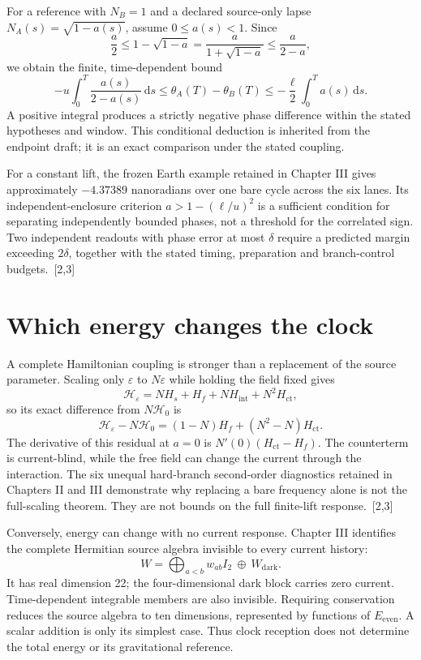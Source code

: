 \documentclass[10pt,twocolumn,letterpaper]{article}
\newcommand{\dd}{\mathrm{d}}
\begin{document}
For a reference with $N_B=1$ and a declared source-only lapse $N_A(s)=\sqrt{1-a(s)}$, assume $0\le a(s)<1$. Since
\[
 \frac a 2\le 1-\sqrt{1-a}=\frac{a}{1+\sqrt{1-a}}
 \le\frac{a}{2-a},
\]
we obtain the finite, time-dependent bound
\[
 -u\int_0^T\frac{a(s)}{2-a(s)}\,\dd s
 \le\theta_A(T)-\theta_B(T)
 \le-\frac\ell 2\int_0^Ta(s)\,\dd s.
\]
A positive integral produces a strictly negative phase difference within the stated hypotheses and window. This conditional deduction is inherited from the endpoint draft; it is an exact comparison under the stated coupling.

For a constant lift, the frozen Earth example retained in Chapter III gives approximately $-4.37389$ nanoradians over one bare cycle across the six lanes. Its independent-enclosure criterion $a>1-(\ell/u)^2$ is a sufficient condition for separating independently bounded phases, not a threshold for the correlated sign. Two independent readouts with phase error at most $\delta$ require a predicted margin exceeding $2\delta$, together with the stated timing, preparation and branch-control budgets.~[2,3]


\section{Which energy changes the clock}
A complete Hamiltonian coupling is stronger than a replacement of the source parameter. Scaling only $\varepsilon$ to $N\varepsilon$ while holding the field fixed gives
\[
 \mathcal H_\varepsilon=NH_s+H_f+NH_{\mathrm{int}}+N^2H_{\mathrm{ct}},
\]
so its exact difference from $N\mathcal H_0$ is
\[
 \mathcal H_\varepsilon-N\mathcal H_0
 =(1-N)H_f+(N^2-N)H_{\mathrm{ct}}.
\]
The derivative of this residual at $a=0$ is $N'(0)(H_{\mathrm{ct}}-H_f)$. The counterterm is current-blind, while the free field can change the current through the interaction. The six unequal hard-branch second-order diagnostics retained in Chapters II and III demonstrate why replacing a bare frequency alone is not the full-scaling theorem. They are not bounds on the full finite-lift response.~[2,3]

Conversely, energy can change with no current response. Chapter III identifies the complete Hermitian source algebra invisible to every current history:
\[
 W=\bigoplus_{a<b}w_{ab}I_2\ \oplus\ W_{\mathrm{dark}}.
\]
It has real dimension 22; the four-dimensional dark block carries zero current. Time-dependent integrable members are also invisible. Requiring conservation reduces the source algebra to ten dimensions, represented by functions of $E_{\mathrm{even}}$. A scalar addition is only its simplest case. Thus clock reception does not determine the total energy or its gravitational reference.
\end{document}
